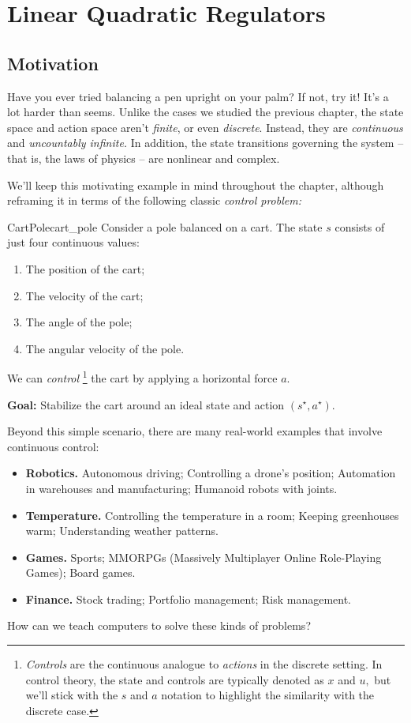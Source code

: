 \documentclass[../main/main]{subfiles}
\begin{document}
    
\chapter{Linear Quadratic Regulators}


\section{Motivation}

Have you ever tried balancing a pen upright on your palm?
If not, try it! It's a lot harder than seems.
Unlike the cases we studied the previous chapter,
the state space and action space aren't \emph{finite}, or even \emph{discrete}.
Instead, they are \emph{continuous} and \emph{uncountably infinite.}
In addition, the state transitions governing the system -- that is, the laws of physics --
are nonlinear and complex.

We'll keep this motivating example in mind throughout the chapter,
although reframing it in terms of the following classic \emph{control problem:}

\begin{example}{CartPole}{cart_pole}
    Consider a pole balanced on a cart.
    The state $s$ consists of just four continuous values:

    \begin{enumerate}
        \item The position of the cart;
        \item The velocity of the cart;
        \item The angle of the pole;
        \item The angular velocity of the pole.
    \end{enumerate}

    \noindent
    We can \emph{control}
    \footnote{\emph{Controls} are the continuous analogue to \emph{actions} in the discrete setting. In control theory, the state and controls are typically denoted as
    $x$ and $u,$ but we'll stick with the $s$ and $a$ notation to highlight the
    similarity with the discrete case.}
    the cart by applying a horizontal force $a$.

    \noindent
    \textbf{Goal:} Stabilize the cart around an ideal state and action $(s^\star, a^\star)$.
\end{example}

Beyond this simple scenario, there are many real-world examples that involve continuous control:
\begin{itemize}
    \item \textbf{Robotics.} Autonomous driving; Controlling a drone's position; Automation in warehouses and manufacturing; Humanoid robots with joints.
    \item \textbf{Temperature.} Controlling the temperature in a room; Keeping greenhouses warm; Understanding weather patterns.
    \item \textbf{Games.} Sports; MMORPGs (Massively Multiplayer Online Role-Playing Games); Board games.
    \item \textbf{Finance.} Stock trading; Portfolio management; Risk management.
\end{itemize}
How can we teach computers to solve these kinds of problems?
\end{document}
